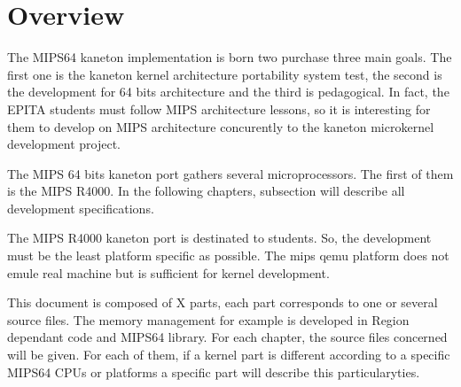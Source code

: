 %
%
%
%
%
%

%
%

\chapter{Overview}

The MIPS64 kaneton implementation is born two purchase three main goals.
The first one is the kaneton kernel architecture portability system test,
the second is the development for 64 bits architecture and the third is pedagogical.
In fact, the EPITA students must follow MIPS architecture lessons, so it is interesting 
for them to develop on MIPS architecture concurently to the kaneton microkernel development
project.

The MIPS 64 bits kaneton port gathers several microprocessors. The first of them is the MIPS R4000. In the following chapters, subsection will describe all development specifications.

The MIPS R4000 kaneton port is destinated to students. So, the development must be the least platform specific as possible.
The mips qemu platform does not emule real machine but is sufficient for kernel development.

This document is composed of X parts, each part corresponds to one or several source files. The memory management for example is developed in Region dependant code and MIPS64 library. For each chapter, the source files concerned will be given.
For each of them, if a kernel part is different according to a specific MIPS64 CPUs or platforms a specific part will describe this particularyties.
